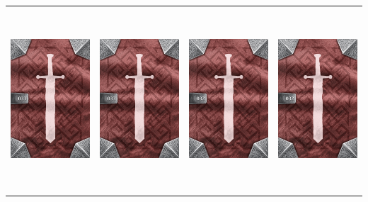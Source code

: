 \documentclass{minimal}
\begin{document}
{\begin{longtable}{llll}
\includegraphics[width=44mm,height=68mm]{./29-35/gh-033-volatile-bomb-back.png} &
\includegraphics[width=44mm,height=68mm]{./29-35/gh-033-volatile-bomb-back.png} &
\includegraphics[width=44mm,height=68mm]{./29-35/gh-032-tower-shield-back.png} &
\includegraphics[width=44mm,height=68mm]{./29-35/gh-032-tower-shield-back.png}\\ 

\end{longtable}}
\end{document}
